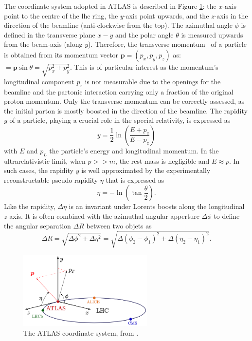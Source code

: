 The coordinate system adopted in ATLAS is described in Figure \ref{fig-AtlasCoord}: the $x$-axis point to the centre of the \gls{lhc} ring, the $y$-axis point upwards, and the $z$-axis in the direction of the beamline (anti-clockwise from the top). The azimuthal angle $\phi$ is defined in the transverse plane $x-y$ and the polar angle $\theta$ is measured upwards from the beam-axis (along $y$). Therefore, the transverse momentum \pt\ of a particle is obtained from its momentum vector $\boldsymbol{p} = (p_x, p_y, p_z)$ as: \pt\ $=\boldsymbol{p} \sin\theta = \sqrt{p_x^2 + p_y^2}$. This is of particular interest as the momentum's longitudinal component $p_z$ is not measurable due to the openings for the beamline and the partonic interaction carrying only a fraction of the original proton momentum. Only the transverse momentum can be correctly assessed, as the initial parton is mostly boosted in the direction of the beamline. The rapidity $y$ of a particle, playing a crucial role in the special relativity, is expressed as 
\begin{equation}
  y = \frac{1}{2} \ln \left(\frac{E + p_z}{E - p_z}\right)
\end{equation}
with $E$ and $p_L$ the particle's energy and longitudinal momentum. In the ultrarelativistic limit, when $p >> m$, the rest mass is negligible and $E \approx p$. In such cases, the rapidity $y$ is well approximated by the experimentally reconstructable pseudo-rapidity $\eta$ that is expressed as
\begin{equation}
  \eta = -\ln \left(\tan \frac{\theta}{2}\right).
\end{equation}
Like the rapidity, $\Delta \eta$ is an invariant under Lorents boosts along the longitudinal $z$-axis. It is often combined with the azimuthal angular apperture $\Delta \phi$ to define the angular separation $\Delta R$ between two objets as 
\begin{equation}
  \Delta R = \sqrt{\Delta \phi^2 + \Delta \eta^2} =  \sqrt{\Delta (\phi_2 - \phi_1)^2 + \Delta (\eta_2 - \eta_1)^2}.
\end{equation}

\begin{figure}[!h]
  \centering
  \hspace{+1.5cm}
  \includegraphics[width=0.6\textwidth]{Images/ATLAS/atlasCoor.png}
  \caption{The ATLAS coordinate system, from \cite{Strong:2020mge}.}
  \label{fig-AtlasCoord}
\end{figure}

